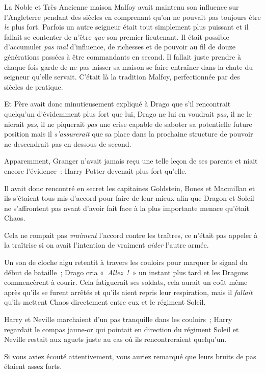 La Noble et Très Ancienne maison Malfoy avait maintenu son influence sur l'Angleterre pendant des siècles en comprenant qu'on ne pouvait pas toujours être \emph{le} plus fort.
Parfois un autre seigneur était tout simplement plus puissant et il fallait se contenter de n'être \emph{que} son premier lieutenant.
Il était possible d'accumuler \emph{pas mal} d'influence, de richesses et de pouvoir au fil de douze générations passées à être commandants en second.
Il fallait juste prendre à chaque fois garde de ne pas laisser sa maison se faire entraîner dans la chute du seigneur qu'elle servait.
C'était là la tradition Malfoy, perfectionnée par des siècles de pratique.

Et Père avait donc minutieusement expliqué à Drago que s'il rencontrait quelqu'un d'évidemment plus fort que lui, Drago ne lui en voudrait \emph{pas}, il ne le nierait \emph{pas}, il ne piquerait \emph{pas} une crise capable de saboter sa potentielle future position mais il \emph{s'assurerait} que sa place dans la prochaine structure de pouvoir ne descendrait pas en dessous de second.

Apparemment, Granger n'avait jamais reçu une telle leçon de ses parents et niait encore l'évidence~: Harry Potter devenait plus fort qu'elle.

Il avait donc rencontré en secret les capitaines Goldstein, Bones et Macmillan et ils s'étaient tous mis d'accord pour faire de leur mieux afin que Dragon et Soleil ne s'affrontent pas avant d'avoir fait face à la plus importante menace qu'était Chaos.

Cela ne rompait pas \emph{vraiment} l'accord contre les traîtres, ce n'était pas appeler à la traîtrise si on avait l'intention de vraiment \emph{aider} l'autre armée.

Un son de cloche aigu retentit à travers les couloirs pour marquer le signal du début de bataille~; Drago cria «~\emph{Allez~!}~» un instant plus tard et les Dragons commencèrent à courir.
Cela fatiguerait ses soldats, cela aurait un coût même après qu'ils se furent arrêtés et qu'ils aient repris leur respiration, mais il \emph{fallait} qu'ils mettent Chaos directement entre eux et le régiment Soleil.

\later

Harry et Neville marchaient d'un pas tranquille dans les couloirs~; Harry regardait le compas jaune-or qui pointait en direction du régiment Soleil et Neville restait aux aguets juste au cas où ils rencontreraient quelqu'un.

Si vous aviez écouté attentivement, vous auriez remarqué que leurs bruits de pas étaient assez forts.

